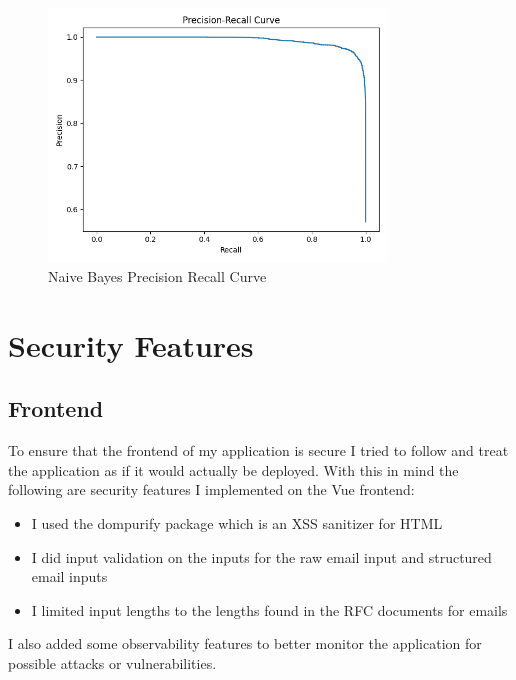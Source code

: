 \documentclass[a4paper,10pt]{article}
\begin{document}
\begin{figure}[ht!]
	\centering
	\includegraphics[width=0.8\textwidth]{model_performance/NaiveBayes/precision_recall_curve.png}
	\caption{Naive Bayes Precision Recall Curve}
	\label{fig:precision-recall-curve}
\end{figure}

\section{Security Features}

\subsection{Frontend}

To ensure that the frontend of my application is secure I tried to follow and
treat the application as if it would actually be deployed. With this in mind the
following are security features I implemented on the Vue frontend:

\begin{itemize}
	\item I used the dompurify package which is an XSS sanitizer for HTML
	\item I did input validation on the inputs for the raw email input and
	      structured email inputs
	\item I limited input lengths to the lengths found in the RFC documents for
	      emails
\end{itemize}

I also added some observability features to better monitor the application for
possible attacks or vulnerabilities.
\end{document}
